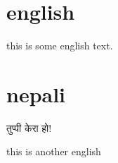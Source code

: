 \documentclass{article}
\begin{document}
\section{english}
this is some english text.

\section{nepali}
\begin{sanskrit}
  तुप्पी केरा हो!
\end{sanskrit}
this is another english
\end{document}
